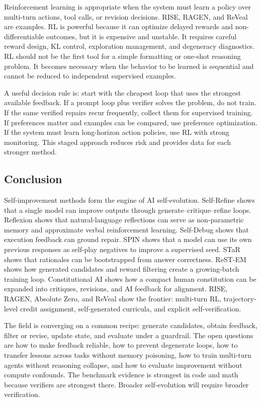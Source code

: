 Reinforcement learning is appropriate when the system must learn a policy over multi-turn actions, tool calls, or revision decisions. RISE, RAGEN, and ReVeal are examples. RL is powerful because it can optimize delayed rewards and non-differentiable outcomes, but it is expensive and unstable. It requires careful reward design, KL control, exploration management, and degeneracy diagnostics. RL should not be the first tool for a simple formatting or one-shot reasoning problem. It becomes necessary when the behavior to be learned is sequential and cannot be reduced to independent supervised examples.

A useful decision rule is: start with the cheapest loop that uses the strongest available feedback. If a prompt loop plus verifier solves the problem, do not train. If the same verified repairs recur frequently, collect them for supervised training. If preferences matter and examples can be compared, use preference optimization. If the system must learn long-horizon action policies, use RL with strong monitoring. This staged approach reduces risk and provides data for each stronger method.

\subsection{Conclusion}
\label{subsec:methods-conclusion}

Self-improvement methods form the engine of AI self-evolution. Self-Refine shows that a single model can improve outputs through generate--critique--refine loops. Reflexion shows that natural-language reflections can serve as non-parametric memory and approximate verbal reinforcement learning. Self-Debug shows that execution feedback can ground repair. SPIN shows that a model can use its own previous responses as self-play negatives to improve a supervised seed. STaR shows that rationales can be bootstrapped from answer correctness. ReST-EM shows how generated candidates and reward filtering create a growing-batch training loop. Constitutional AI shows how a compact human constitution can be expanded into critiques, revisions, and AI feedback for alignment. RISE, RAGEN, Absolute Zero, and ReVeal show the frontier: multi-turn RL, trajectory-level credit assignment, self-generated curricula, and explicit self-verification.

The field is converging on a common recipe: generate candidates, obtain feedback, filter or revise, update state, and evaluate under a guardrail. The open questions are how to make feedback reliable, how to prevent degenerate loops, how to transfer lessons across tasks without memory poisoning, how to train multi-turn agents without reasoning collapse, and how to evaluate improvement without compute confounds. The benchmark evidence is strongest in code and math because verifiers are strongest there. Broader self-evolution will require broader verification.

